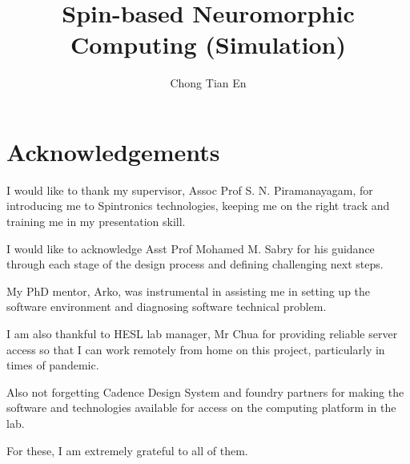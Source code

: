 \title{Spin-based Neuromorphic Computing (Simulation)}
\author{Chong Tian En}
\thesisdate{\today}


\maketitle

\cleardoublepage

\setcounter{page}{1}
\begin{abstractpage}

\end{abstractpage}

\cleardoublepage

\section*{Acknowledgements}
I would like to thank my supervisor, Assoc Prof S. N. Piramanayagam, for introducing me to Spintronics technologies, keeping me on the right track and training me in my presentation skill.

I would like to acknowledge Asst Prof Mohamed M. Sabry for his guidance through each stage of the design process and defining challenging next steps.

My PhD mentor, Arko, was instrumental in assisting me in setting up the software environment and diagnosing software technical problem.

I am also thankful to HESL lab manager, Mr Chua for providing reliable server access so that I can work remotely from home on this project, particularly in times of pandemic.

Also not forgetting Cadence Design System and foundry partners for making the software and technologies available for access on the computing platform in the lab.

For these, I am extremely grateful to all of them.